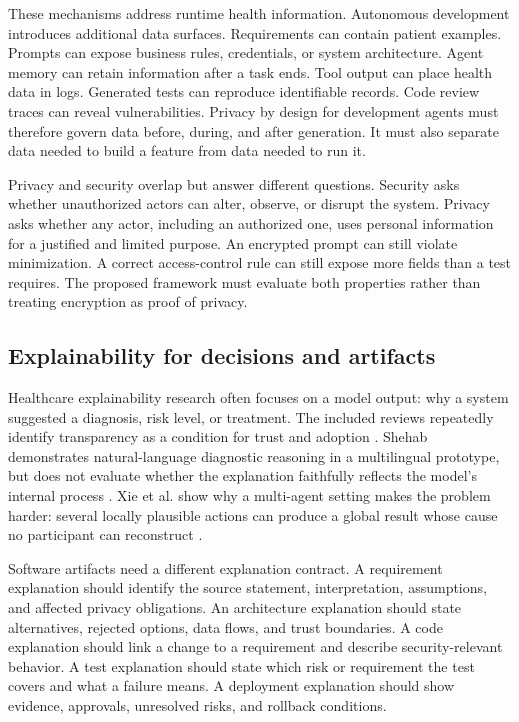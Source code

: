 \documentclass[11pt,a4paper]{article}
\begin{document}
These mechanisms address runtime health information. Autonomous development introduces additional data surfaces. Requirements can contain patient examples. Prompts can expose business rules, credentials, or system architecture. Agent memory can retain information after a task ends. Tool output can place health data in logs. Generated tests can reproduce identifiable records. Code review traces can reveal vulnerabilities. Privacy by design for development agents must therefore govern data before, during, and after generation. It must also separate data needed to build a feature from data needed to run it.

Privacy and security overlap but answer different questions. Security asks whether unauthorized actors can alter, observe, or disrupt the system. Privacy asks whether any actor, including an authorized one, uses personal information for a justified and limited purpose. An encrypted prompt can still violate minimization. A correct access-control rule can still expose more fields than a test requires. The proposed framework must evaluate both properties rather than treating encryption as proof of privacy.

\subsection{Explainability for decisions and artifacts}

Healthcare explainability research often focuses on a model output: why a system suggested a diagnosis, risk level, or treatment. The included reviews repeatedly identify transparency as a condition for trust and adoption \cite{ode2025evidence,saeed2025applications,boye2025decision}. Shehab demonstrates natural-language diagnostic reasoning in a multilingual prototype, but does not evaluate whether the explanation faithfully reflects the model's internal process \cite[pp.~1--4]{shehab2025agentic}. Xie et al. show why a multi-agent setting makes the problem harder: several locally plausible actions can produce a global result whose cause no participant can reconstruct \cite[pp.~5--8]{xie2026ethical}.

Software artifacts need a different explanation contract. A requirement explanation should identify the source statement, interpretation, assumptions, and affected privacy obligations. An architecture explanation should state alternatives, rejected options, data flows, and trust boundaries. A code explanation should link a change to a requirement and describe security-relevant behavior. A test explanation should state which risk or requirement the test covers and what a failure means. A deployment explanation should show evidence, approvals, unresolved risks, and rollback conditions.
\end{document}
